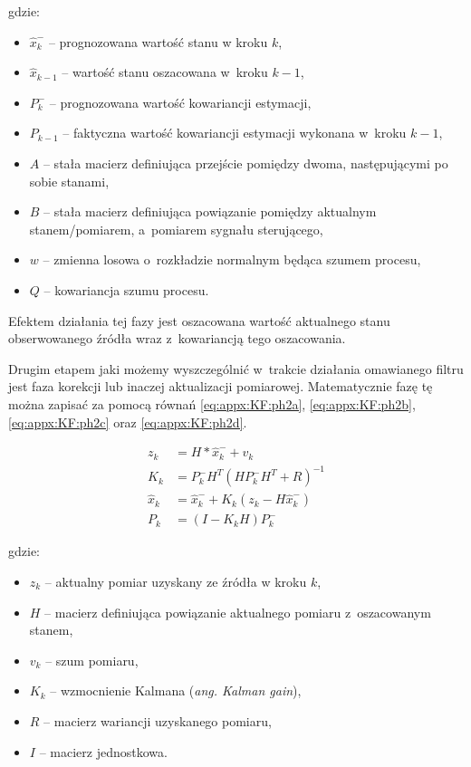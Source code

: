 gdzie:
\begin{itemize}
	\item $\widehat{x}^-_k$ -- prognozowana wartość stanu w kroku $k$,
	\item $\widehat{x}_{k-1}$ -- wartość stanu oszacowana w~kroku $k-1$,
	\item $P^-_k$ -- prognozowana wartość kowariancji estymacji,
	\item $P_{k-1}$ -- faktyczna wartość kowariancji estymacji wykonana w~kroku $k-1$,
	\item $A$ -- stała macierz definiująca przejście pomiędzy dwoma, następującymi po sobie stanami,
	\item $B$ --  stała macierz definiująca powiązanie pomiędzy aktualnym stanem/pomiarem, a~pomiarem sygnału sterującego,
	\item $w$ --  zmienna losowa o~rozkładzie normalnym będąca szumem procesu,
	\item $Q$ --  kowariancja szumu procesu.
\end{itemize}

Efektem działania tej fazy jest oszacowana wartość aktualnego stanu obserwowanego źródła wraz z~kowariancją tego oszacowania.

Drugim etapem jaki możemy wyszczególnić w~trakcie działania omawianego filtru jest faza korekcji lub inaczej aktualizacji pomiarowej. Matematycznie fazę tę można zapisać za pomocą równań \ref{eq:appx:KF:ph2a}, \ref{eq:appx:KF:ph2b}, \ref{eq:appx:KF:ph2c} oraz \ref{eq:appx:KF:ph2d}.

\begin{subequations}
	\begin{align}
		z_k           & = H*\widehat{x}^-_k + v_k \label{eq:appx:KF:ph2a}                        \\
		K_k           & = P^-_{k}H^T(HP^-_{k}H^T + R)^{-1} \label{eq:appx:KF:ph2b}               \\
		\widehat{x}_k & = \widehat{x}^-_k + K_{k}(z_k-H\widehat{x}^-_k)  \label{eq:appx:KF:ph2c} \\
		P_k           & = (I-K_{k}H)P^-_k \label{eq:appx:KF:ph2d}                                
	\end{align}
\end{subequations}

gdzie:
\begin{itemize}
	\item $z_k$ -- aktualny pomiar uzyskany ze źródła w kroku $k$,
	\item $H$ -- macierz definiująca powiązanie aktualnego pomiaru z~oszacowanym stanem,
	\item $v_k$ -- szum pomiaru,
	\item $K_k$ -- wzmocnienie Kalmana (\emph{ang. Kalman gain}),
	\item $R$ -- macierz wariancji uzyskanego pomiaru,
	\item $I$ -- macierz jednostkowa.
\end{itemize}

